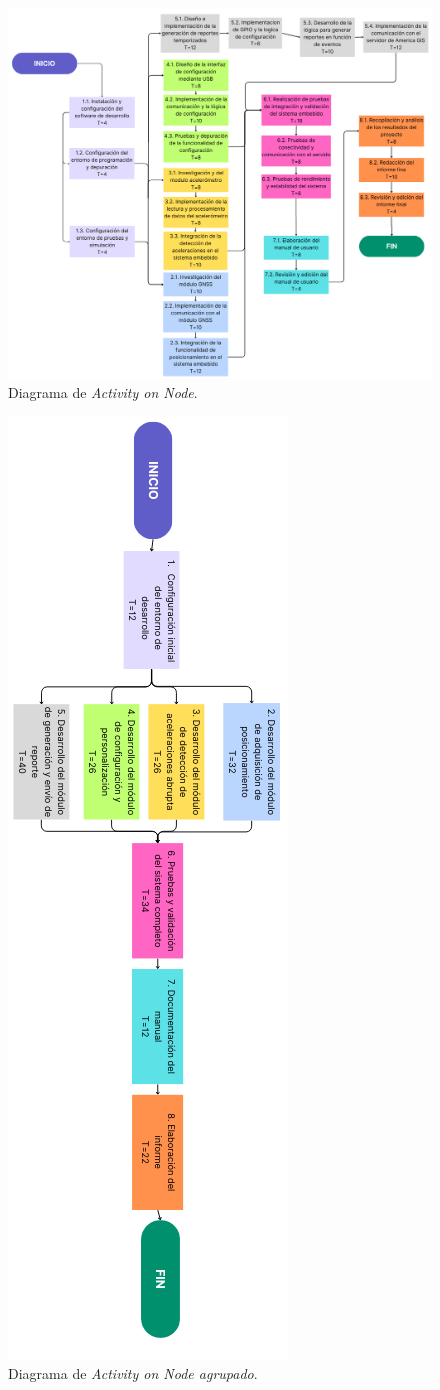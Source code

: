 \documentclass[
11pt, %
codirector, %
]{charter}
\begin{document}
\begin{figure}[htpb]
\centering 
\includegraphics[width=1\textwidth]{./Figuras/diagrama1.png}
\caption{Diagrama de \textit{Activity on Node}.}
\label{fig:AoN}
\end{figure}
\pagebreak

\begin{figure}[htpb]
\centering 
\includegraphics[width=.35\textwidth]{./Figuras/diagrama2rot.png}
\caption{Diagrama de \textit{Activity on Node agrupado}.}
\label{fig:AoN}
\end{figure}
\pagebreak
\end{document}
